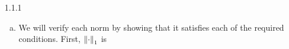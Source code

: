 \documentclass[../../Solutions.tex]{subfiles}
\begin{document}
\begin{itemize}
	\item [1.1.1]
		\begin{enumerate}[(a)]
			\item We will verify each norm by showing that it satisfies each of the required conditions. First, $\left\lVert\cdot\right\rVert_1$ is
		\end{enumerate}
\end{itemize}
\end{document}

